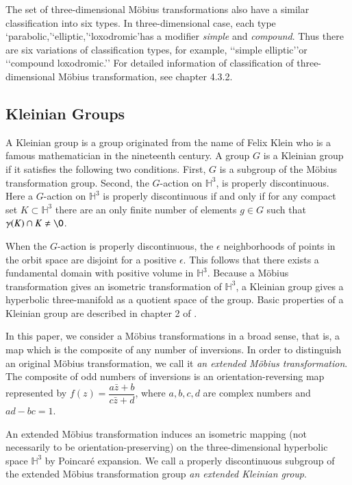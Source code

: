 The set of three-dimensional M\"obius transformations also have a similar
classification into six types.
In three-dimensional case, each type \lq parabolic,\rq \lq elliptic,\rq \lq loxodromic\rq has 
a modifier \textit{simple} and \textit{compound}.
Thus there are six variations of classification types, for example, \lq\lq simple elliptic\rq\rq or
\lq\lq compound loxodromic.\rq\rq
For detailed information of classification of three-dimensional M\"obius transformation, see chapter 4.3.2.

\subsection{Kleinian Groups}

A Kleinian group is a group originated from the name of Felix Klein who is
a famous mathematician in the nineteenth century.
A group $G$ is a Kleinian group if it satisfies the following two
conditions. 
First, $G$ is a subgroup of the M\"obius transformation group.
Second, the $G$-action on $\mathbb{H}^3$,
is properly discontinuous.
Here a $G$-action on $\mathbb{H}^3$
is properly discontinuous if and only if
for any compact set $K \subset \mathbb{H}^3$
there are an only finite number of elements $g \in G$ such that
$\gamma (K) \cap K \neq \O$.

When the $G$-action is properly discontinuous, 
the $\epsilon$ neighborhoods of points in the orbit space are disjoint
for a positive $\epsilon$.
This follows that there exists a
fundamental domain with positive volume in $\mathbb{H}^3$.
Because a M\"obius transformation gives an isometric transformation of
$\mathbb{H}^3$, a Kleinian group gives a hyperbolic three-manifold 
as a quotient space of the group. 
Basic properties of a Kleinian group are described in chapter 2 of \cite{marden_2016}.

In this paper, we consider a M\"obius transformations in a broad sense, that is,
a map which is the composite of
any number of inversions.
In order to distinguish an original M\"obius transformation,
we call it \textit{an extended M\"obius transformation}.
The composite of odd numbers of inversions
is an orientation-reversing map represented by $f(z)=\dfrac{a{\bar{z}}+b}{c{\bar{z}}+d}$, where
$a, b, c, d$ are complex numbers and $ad-bc = 1$.

An extended M\"obius transformation induces an isometric mapping 
(not necessarily to be orientation-preserving) on the three-dimensional hyperbolic space $\mathbb{H}^3$ by
Poincar\'e expansion.
We call a properly discontinuous subgroup of the extended M\"obius transformation group
\textit{an extended Kleinian group}.

